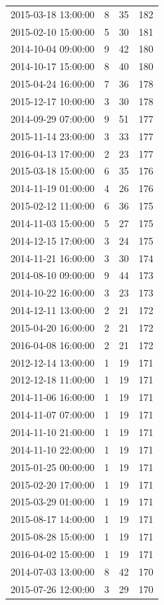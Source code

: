 \begin{tabular}{lrrr}
2015-03-18 13:00:00 & 8 & 35 & 182 \\
2015-02-10 15:00:00 & 5 & 30 & 181 \\
2014-10-04 09:00:00 & 9 & 42 & 180 \\
2014-10-17 15:00:00 & 8 & 40 & 180 \\
2015-04-24 16:00:00 & 7 & 36 & 178 \\
2015-12-17 10:00:00 & 3 & 30 & 178 \\
2014-09-29 07:00:00 & 9 & 51 & 177 \\
2015-11-14 23:00:00 & 3 & 33 & 177 \\
2016-04-13 17:00:00 & 2 & 23 & 177 \\
2015-03-18 15:00:00 & 6 & 35 & 176 \\
2014-11-19 01:00:00 & 4 & 26 & 176 \\
2015-02-12 11:00:00 & 6 & 36 & 175 \\
2014-11-03 15:00:00 & 5 & 27 & 175 \\
2014-12-15 17:00:00 & 3 & 24 & 175 \\
2014-11-21 16:00:00 & 3 & 30 & 174 \\
2014-08-10 09:00:00 & 9 & 44 & 173 \\
2014-10-22 16:00:00 & 3 & 23 & 173 \\
2014-12-11 13:00:00 & 2 & 21 & 172 \\
2015-04-20 16:00:00 & 2 & 21 & 172 \\
2016-04-08 16:00:00 & 2 & 21 & 172 \\
2012-12-14 13:00:00 & 1 & 19 & 171 \\
2012-12-18 11:00:00 & 1 & 19 & 171 \\
2014-11-06 16:00:00 & 1 & 19 & 171 \\
2014-11-07 07:00:00 & 1 & 19 & 171 \\
2014-11-10 21:00:00 & 1 & 19 & 171 \\
2014-11-10 22:00:00 & 1 & 19 & 171 \\
2015-01-25 00:00:00 & 1 & 19 & 171 \\
2015-02-20 17:00:00 & 1 & 19 & 171 \\
2015-03-29 01:00:00 & 1 & 19 & 171 \\
2015-08-17 14:00:00 & 1 & 19 & 171 \\
2015-08-28 15:00:00 & 1 & 19 & 171 \\
2016-04-02 15:00:00 & 1 & 19 & 171 \\
2014-07-03 13:00:00 & 8 & 42 & 170 \\
2015-07-26 12:00:00 & 3 & 29 & 170 \\

\end{tabular}
